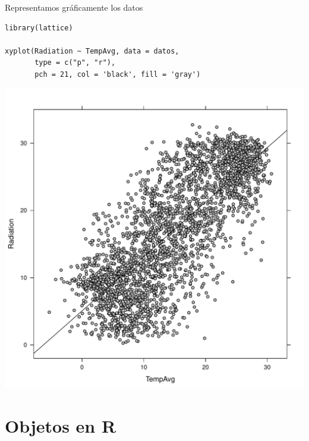 \documentclass[xcolor={usenames,svgnames,dvipsnames}]{beamer}
\begin{document}
\begin{frame}[fragile,label={sec:org764e843}]{Representamos gráficamente los datos}
 \lstset{language=r,label= ,caption= ,captionpos=b,numbers=none}
\begin{lstlisting}
library(lattice)

xyplot(Radiation ~ TempAvg, data = datos,
       type = c("p", "r"),
       pch = 21, col = 'black', fill = 'gray')
\end{lstlisting}

\begin{center}
\includegraphics[height=0.6\textheight]{figs/intro.pdf}
\end{center}
\end{frame}

\section{Objetos en R}
\label{sec:org610de28}
\end{document}
